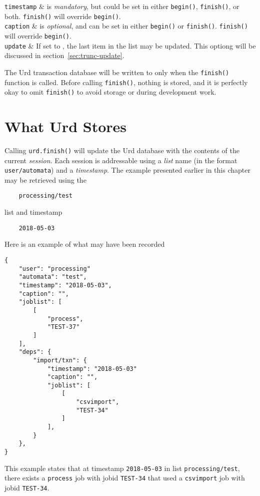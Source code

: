 \RPtwo \texttt{timestamp} & is \textsl{mandatory}, but could be set in either
  \texttt{begin()}, \texttt{finish()}, or both.  \texttt{finish()}
  will override \texttt{begin()}.\\[2ex]

\RPtwo \texttt{caption} & is \textsl{optional}, and can be set in either
  \texttt{begin()} or \texttt{finish()}.  \texttt{finish()}
  will override \texttt{begin()}.\\[2ex]

\RPtwo \texttt{update} &  If set to \pyTrue, the last item in the list may be updated.
  This optiong will be discussed in section~\ref{sec:trunc-update}.\\[2ex]
\stoptabletwo

The Urd transaction database will be written to only when
the \texttt{finish()} function is called.  Before
calling \texttt{finish()}, nothing is stored, and it is perfectly okay
to omit \texttt{finish()} to avoid storage or during development work.



\section{What Urd Stores}

Calling \texttt{urd.finish()} will update the Urd database with the
contents of the current \textsl{session}.  Each session is addressable
using a \textsl{list} name (in the format \texttt{user/automata}) and
a \textsl{timestamp}.  The example presented earlier in this chapter
may be retrieved using the
\begin{verbatim}
    processing/test
\end{verbatim}
list and timestamp
\begin{verbatim}
    2018-05-03
\end{verbatim}
Here is an example of what may have been recorded\begin{leftbar}
\begin{verbatim}
{
    "user": "processing"
    "automata": "test",
    "timestamp": "2018-05-03",
    "caption": "",
    "joblist": [
        [
            "process",
            "TEST-37"
        ]
    ],
    "deps": {
        "import/txn": {
            "timestamp": "2018-05-03"
            "caption": "",
            "joblist": [
                [
                    "csvimport",
                    "TEST-34"
                ]
            ],
        }
    },
}
\end{verbatim}
\end{leftbar}
\noindent This example states that at timestamp \texttt{2018-05-03} in list \texttt{processing/test},
there exists a \texttt{process} job with jobid \texttt{TEST-34} that
used a \texttt{csvimport} job with jobid \texttt{TEST-34}.

